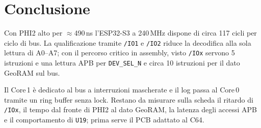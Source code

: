\documentclass[12pt, a4paper]{article}
\begin{document}
\section{Conclusione}
Con PHI2 alto per $\approx$490\,ns l'ESP32-S3 a 240\,MHz dispone di circa 117 cicli per ciclo di bus. La qualificazione tramite \texttt{/IO1} e \texttt{/IO2} riduce la decodifica alla sola lettura di A0--A7; con il percorso critico in assembly, visto \texttt{/IOx} servono 5 istruzioni e una lettura APB per \texttt{DEV\_SEL\_N} e circa 10 istruzioni per il dato GeoRAM sul bus.

Il Core\,1 è dedicato al bus a interruzioni mascherate e il log passa al Core\,0 tramite un ring buffer senza lock. Restano da misurare sulla scheda il ritardo di \texttt{/IOx}, il tempo dal fronte di PHI2 al dato GeoRAM, la latenza degli accessi APB e il comportamento di \texttt{U19}; prima serve il PCB adattato al C64.
\end{document}
